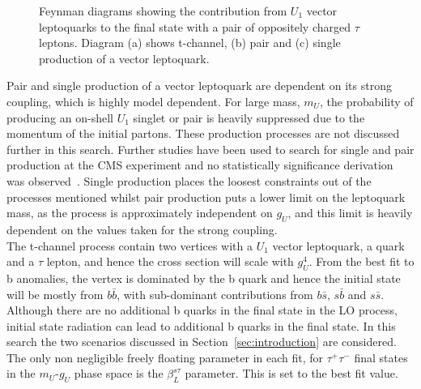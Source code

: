 \begin{figure}[H]
\begin{subfigure}[b]{0.3\textwidth}
\caption{}
\end{subfigure}
\vspace*{10mm}
\caption{Feynman diagrams showing the contribution from $U_1$ vector leptoquarks to the final state with a pair of oppositely charged $\tau$ leptons. Diagram (a) shows t-channel, (b) pair and (c) single production of a vector leptoquark.}
\label{fig:leptoquark_feynman}
\end{figure}

Pair and single production of a vector leptoquark are dependent on its strong coupling, which is highly model dependent.
For large mass, $m_U$, the probability of producing an on-shell $U_1$ singlet or pair is heavily suppressed due to the momentum of the initial partons.
These production processes are not discussed further in this search.
Further studies have been used to search for single and pair production at the CMS experiment and no statistically significance derivation was observed~\cite{CMS:2022zks}.
Single production places the loosest constraints out of the processes mentioned whilst pair production puts a lower limit on the leptoquark mass, as the process is approximately independent on $g_U$, and this limit is heavily dependent on the values taken for the strong coupling. \\

The t-channel process contain two vertices with a $U_1$ vector leptoquark, a quark and a $\tau$ lepton, and hence the cross section will scale with $g_{U}^4$.
From the best fit to b anomalies, the vertex is dominated by the b quark and hence the initial state will be mostly from $b\bar{b}$, with sub-dominant contributions from $b\bar{s}$, $s\bar{b}$ and $s\bar{s}$.
Although there are no additional b quarks in the final state in the LO process, initial state radiation can lead to additional b quarks in the final state.
In this search the two scenarios discussed in Section~\ref{sec:introduction} are considered.
The only non negligible freely floating parameter in each fit, for $\tau^{+}\tau^{-}$ final states in the $m_{U}$-$g_{U}$ phase space is the $\beta_{L}^{s\tau}$ parameter.
This is set to the best fit value. \\

